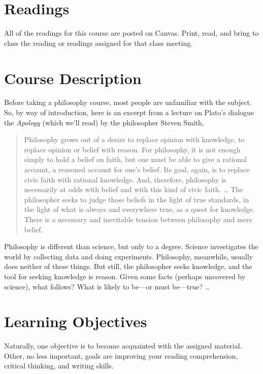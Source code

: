 \documentclass[11pt,oneside]{article}
\begin{document}



\section{Readings}

All of the readings for this course are posted on Canvas. Print, read, and bring to class the reading or readings assigned for that class meeting.


\section{Course Description}

Before taking a philosophy course, most people are unfamiliar with the subject. So, by way of introduction, here is an excerpt from a lecture on Plato’s dialogue the \textit{Apology} (which we’ll read) by the philosopher Steven Smith, 
\begin{quote}
Philosophy grows out of a desire to replace opinion with knowledge, to replace opinion or belief with reason. For philosophy, it is not enough simply to hold a belief on faith, but one must be able to give a rational account, a reasoned account for one’s belief. Its goal, again, is to replace civic faith with rational knowledge. And, therefore, philosophy is necessarily at odds with belief and with this kind of civic faith. … The philosopher seeks to judge those beliefs in the light of true standards, in the light of what is always and everywhere true, as a quest for knowledge. There is a necessary and inevitable tension between philosophy and mere belief.
\end{quote}

Philosophy is different than science, but only to a degree. Science investigates the world by collecting data and doing experiments. Philosophy, meanwhile, usually does neither of these things. But still, the philosopher seeks knowledge, and the tool for seeking knowledge is reason. Given some facts (perhaps uncovered by science), what follows? What is likely to be---or must be---true? \ldots


\section{Learning Objectives}

Naturally, one objective is to become acquainted with the assigned material. Other, no less important, goals are improving your reading comprehension, critical thinking, and writing skills.
\end{document}
